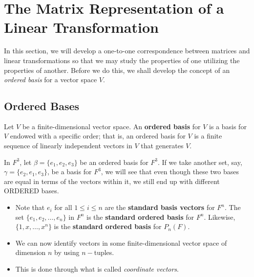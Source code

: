 \section{The Matrix Representation of a Linear Transformation}

In this section, we will develop a one-to-one correspondence between matrices and linear transformations so that we may study the properties of one utilizing the properties of another. Before we do this, we shall develop the concept of an \textit{ordered basis} for a vector space \( V  \).

\subsection{Ordered Bases}

\begin{definition}
    Let \( V  \) be a finite-dimensional vector space. An \textbf{ordered basis} for \( V  \) is a basis for \( V  \) endowed with a specific order; that is, an ordered basis for \( V  \) is a finite sequence of linearly independent vectors in \( V  \) that generates \( V  \).
\end{definition}

\begin{eg}
    In \( F^{3} \), let \( \beta = \{ e_{1}, e_{2}, e_{3} \}  \) be an ordered basis for \( F^{3} \). If we take another set, say, \( \gamma = \{ e_{2}, e_{1}, e_{3} \}  \), be a basis for \( F^{3} \), we will see that even though these two bases are equal in terms of the vectors within it, we still end up with different ORDERED bases.
\end{eg}

\begin{itemize}
   \item Note that \( e_{i}  \) for all \( 1 \leq  i \leq n  \) are the \textbf{standard basis vectors} for \( F^{n} \). The set \( \{  e_{1}, e_{2}, \dots, e_{n} \}  \) in \( F^{n} \) is the \textbf{standard ordered basis} for \( F^{n} \). Likewise, \( \{ 1,x,\dots, x^{n} \}  \) is the \textbf{standard ordered basis} for \( P_{n}(F) \).
    \item We can now identify vectors in some finite-dimensional vector space of dimension \( n  \) by using \( n- \)tuples.
    \item This is done through what is called \textit{coordinate vectors}.
\end{itemize}

